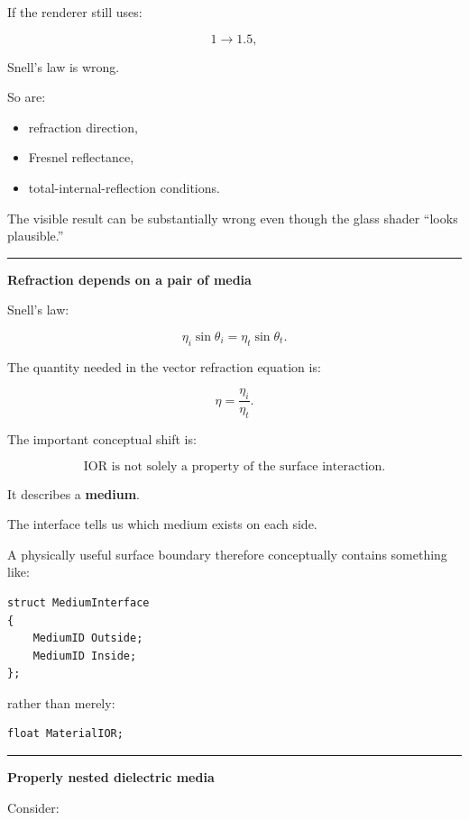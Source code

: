 If the renderer still uses:

\[
1\rightarrow1.5,
\]

Snell's law is wrong.

So are:

\begin{itemize}
\tightlist
\item
  refraction direction,
\item
  Fresnel reflectance,
\item
  total-internal-reflection conditions.
\end{itemize}

The visible result can be substantially wrong even though the glass shader ``looks plausible.''

\begin{center}\rule{0.5\linewidth}{0.5pt}\end{center}

\textbf{Refraction depends on a pair of media}

Snell's law:

\[
\boxed{
\eta_i\sin\theta_i
=
\eta_t\sin\theta_t.
}
\]

The quantity needed in the vector refraction equation is:

\[
\boxed{
\eta=
\frac{\eta_i}{\eta_t}.
}
\]

The important conceptual shift is:

\[
\boxed{
\text{IOR is not solely a property of the surface interaction.}
}
\]

It describes a \textbf{medium}.

The interface tells us which medium exists on each side.

A physically useful surface boundary therefore conceptually contains something like:

\begin{verbatim}
struct MediumInterface
{
    MediumID Outside;
    MediumID Inside;
};
\end{verbatim}

rather than merely:

\begin{verbatim}
float MaterialIOR;
\end{verbatim}

\begin{center}\rule{0.5\linewidth}{0.5pt}\end{center}

\textbf{Properly nested dielectric media}

Consider:

